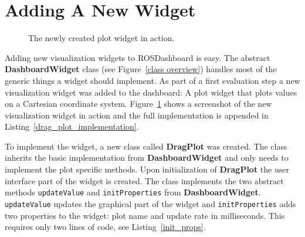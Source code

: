\section{Adding A New Widget}

\begin{figure}[htb]
  \centering
  \caption{The newly created plot widget in action.}
  \label{plot_widget}
\end{figure}

Adding new visualization widgets to ROSDashboard is easy. The abstract \textbf{DashboardWidget} class (see Figure~\ref{class overview}) handles most of the generic things a widget should implement. As part of a first evaluation step a new visualization widget was added to the dashboard: A plot widget that plots values on a Cartesian coordinate system. Figure~\ref{plot_widget} shows a screenshot of the new visualization widget in action and the full implementation is appended in Listing~\ref{drag_plot_implementation}.

To implement the widget, a new class called \textbf{DragPlot} was created. The class inherits the basic implementation from \textbf{DashboardWidget} and only needs to implement the plot specific methods. Upon initialization of \textbf{DragPlot} the user interface part of the widget is created. The class implements the two abstract methods \verb+updateValue+ and \verb+initProperties+ from \textbf{DashboardWidget}. \verb+updateValue+ updates the graphical part of the widget and \verb+initProperties+ adds two properties to the widget: plot name and update rate in milliseconds. This requires only two lines of code, see Listing~\ref{init_props}.

